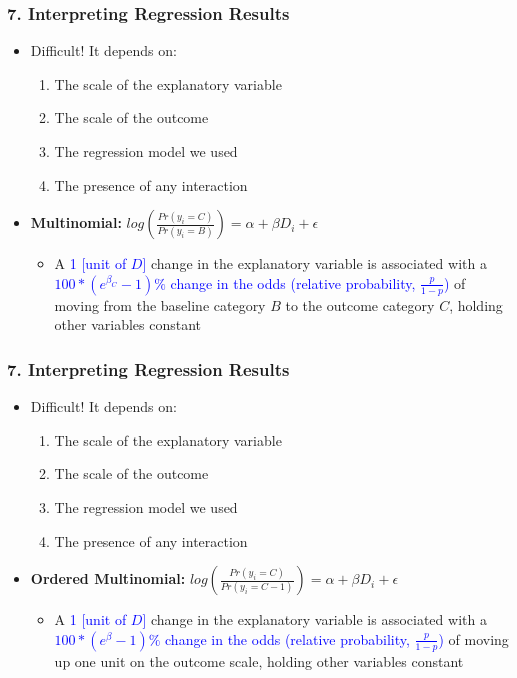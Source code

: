 \documentclass[xcolor=x11names,compress]{beamer}\usepackage[]{graphicx}\usepackage[]{color}
\renewcommand{\(}{\begin{columns}}
\renewcommand{\)}{\end{columns}}
\newcommand{\<}[1]{\begin{column}{#1}}
\renewcommand{\>}{\end{column}}
\begin{document}
\begin{frame}
\frametitle{7. Interpreting Regression Results}
\begin{itemize}
\item Difficult! It depends on:
\begin{enumerate}
\item The scale of the explanatory variable
\item The scale of the outcome
\item The regression model we used
\item The presence of any interaction
\end{enumerate}
\item \textbf{Multinomial:} $log(\frac{Pr(y_i=C)}{Pr(y_i=B)}) = \alpha + \beta D_i + \epsilon$
\begin{itemize}
\item A \textcolor{blue}{1 [unit of $D$]} change in the explanatory variable is associated with a \textcolor{blue}{$100*(e^{\beta_C}-1)\%$ change in the odds (relative probability, $\frac{p}{1-p}$)} of moving from the baseline category $B$ to the outcome category $C$, holding other variables constant
\end{itemize}
\end{itemize}
\end{frame}

\begin{frame}
\frametitle{7. Interpreting Regression Results}
\begin{itemize}
\item Difficult! It depends on:
\begin{enumerate}
\item The scale of the explanatory variable
\item The scale of the outcome
\item The regression model we used
\item The presence of any interaction
\end{enumerate}
\item \textbf{Ordered Multinomial:} $log(\frac{Pr(y_i=C)}{Pr(y_i=C-1)}) = \alpha + \beta D_i + \epsilon$
\begin{itemize}
\item A \textcolor{blue}{1 [unit of $D$]} change in the explanatory variable is associated with a \textcolor{blue}{$100*(e^{\beta}-1)\%$ change in the odds (relative probability, $\frac{p}{1-p}$)} of moving up one unit on the outcome scale, holding other variables constant
\end{itemize}
\end{itemize}
\end{frame}
\end{document}
